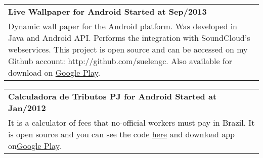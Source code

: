 \documentclass[a4paper, oneside, final]{scrartcl}
\newcommand{\vspc}{\vspace{0.15cm}} %
\begin{document}
\begin{center}
\begin{tabularx}{1\linewidth}{X}
{\bf Live Wallpaper for Android \hfill Started at Sep/2013} \\
Dynamic wall paper for the Android platform. Was developed in Java and Android API. Performs the integration with SoundCloud's webservices. This project is open source and can be accessed on my Github account: http://github.com/suelengc. Also available for download on {\href{https://play.google.com/store/apps/details?id=br.com.suelengc.wallpaper}{Google Play}}. \vspc\\
\end{tabularx}

\begin{tabularx}{1\linewidth}{X}
{\bf Calculadora de Tributos PJ for Android \hfill Started at Jan/2012} \\
It is a calculator of fees that no-official workers must pay in Brazil. It is open source and you can see the code {\href{https://github.com/SuelenGC/my-books}{here}} and download app on{\href{https://play.google.com/store/apps/details?id=br.com.suelengc.calctributospj}{Google Play}}.\vspc\\
\end{tabularx}




\end{center}
\end{document}
